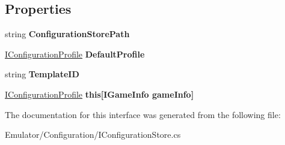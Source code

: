 \subsection*{Properties}
\begin{DoxyCompactItemize}
\item 
\hypertarget{interface_snowflake_1_1_emulator_1_1_configuration_1_1_i_configuration_store_abee37ff32fffbb18aa28398c50555239}{}string {\bfseries Configuration\+Store\+Path}\label{interface_snowflake_1_1_emulator_1_1_configuration_1_1_i_configuration_store_abee37ff32fffbb18aa28398c50555239}

\item 
\hypertarget{interface_snowflake_1_1_emulator_1_1_configuration_1_1_i_configuration_store_aeb1cb23930077d6d5f6a7a65544f8dd4}{}\hyperlink{interface_snowflake_1_1_emulator_1_1_configuration_1_1_i_configuration_profile}{I\+Configuration\+Profile} {\bfseries Default\+Profile}\label{interface_snowflake_1_1_emulator_1_1_configuration_1_1_i_configuration_store_aeb1cb23930077d6d5f6a7a65544f8dd4}

\item 
\hypertarget{interface_snowflake_1_1_emulator_1_1_configuration_1_1_i_configuration_store_ae55b8f0315a537865ba5e4b1186f432d}{}string {\bfseries Template\+I\+D}\label{interface_snowflake_1_1_emulator_1_1_configuration_1_1_i_configuration_store_ae55b8f0315a537865ba5e4b1186f432d}

\item 
\hypertarget{interface_snowflake_1_1_emulator_1_1_configuration_1_1_i_configuration_store_a318a016178c3f07d5f8395cf21332eb9}{}\hyperlink{interface_snowflake_1_1_emulator_1_1_configuration_1_1_i_configuration_profile}{I\+Configuration\+Profile} {\bfseries this\mbox{[}\+I\+Game\+Info game\+Info\mbox{]}}\label{interface_snowflake_1_1_emulator_1_1_configuration_1_1_i_configuration_store_a318a016178c3f07d5f8395cf21332eb9}

\end{DoxyCompactItemize}


The documentation for this interface was generated from the following file\+:\begin{DoxyCompactItemize}
\item 
Emulator/\+Configuration/I\+Configuration\+Store.\+cs\end{DoxyCompactItemize}
